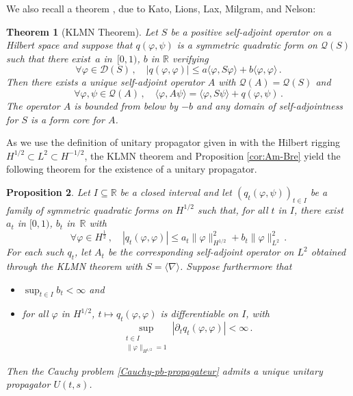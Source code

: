 \documentclass[12pt]{article}
\newcommand{\jnabla}{{\langle\nabla\rangle}}
\theoremstyle{plain}
\newtheorem{theo}{Theorem}[section]
\newtheorem{prop}[theo]{Proposition}
\begin{document}
We also recall a theorem \cite[Theorem X.17]{reed_sim_vol2}, due to Kato, Lions, Lax, Milgram, and Nelson:


\begin{theo}[KLMN Theorem]
   Let $S$ be a positive self-adjoint operator on a Hilbert space and suppose that $q(\varphi,\psi)$ is a symmetric quadratic form on $\mathcal{Q}(S)$ such that there exist~$a$ in~$[0,1)$, $b$ in $\mathbb{R}$ verifying
   \begin{equation}
       \forall \varphi \in \mathcal{D}(S)\,, \quad |q(\varphi,\varphi)| \leq a \langle \varphi, S \varphi \rangle + b \langle \varphi, \varphi \rangle \,.
   \end{equation}
   Then there exists a unique self-adjoint operator $A$ with $\mathcal{Q}(A)=\mathcal{Q}(S)$ and
   \begin{equation}
       \forall \varphi,\psi \in \mathcal{Q}(A) \,, \quad \langle\varphi, A \psi\rangle = \langle \varphi, S \psi \rangle + q(\varphi,\psi)\,.
   \end{equation}
   The operator $A$ is bounded from below by $-b$ and any domain of self-adjointness for $S$ is a form core for $A$.
\end{theo}

As we use the definition of unitary propagator given in \cite[Appendix C]{AmmariBreteaux} with the Hilbert rigging $H^{1/2}\subset L^2\subset H^{-1/2}$, the KLMN theorem and Proposition \ref{cor:Am-Bre} yield the following theorem for the existence of a unitary propagator.

\begin{prop}\label{theorem:Existence-of-propagator-theoretic-result}
 Let $I\subseteq \mathbb{R}$ be a closed interval and let $(q_t(\varphi,\psi))_{t\in I}$ be a family of symmetric quadratic forms on $H^{1/2}$ such that, for all $t$ in $I$, there exist $a_t$ in $[0,1)$, $b_t$ in~$\mathbb{R}$ with
   \begin{equation}
       \forall \varphi \in H^{\frac12}\,, \quad |q_t(\varphi,\varphi)| \leq a_t   \|\varphi\|_{H^{1/2}}^2 + b_t \|\varphi\|_{L^2}^2  \,.
   \end{equation}
   For each such $q_t$, let $A_t$ be the corresponding self-adjoint operator on $L^2$ obtained through the KLMN theorem with $S=\jnabla$.
   Suppose furthermore that
   \begin{itemize}
       \item $\sup_{t\in I} b_t < \infty$ and
       \item for all $\varphi$ in $H^{1/2}$, $t\mapsto q_t(\varphi,\varphi)$ is differentiable on $I$, with
       \begin{equation}
           \sup_{\substack{t\in I\\ \|\varphi\|_{H^{1/2}}=1}} |\partial_t q_t(\varphi,\varphi)| <\infty\,. \label{eqn:bound-time-derivative-q(t)}
       \end{equation}
   \end{itemize}

Then the Cauchy problem \eqref{Cauchy-pb-propagateur} admits a unique unitary propagator $U(t,s)$.
\end{prop}
\end{document}
